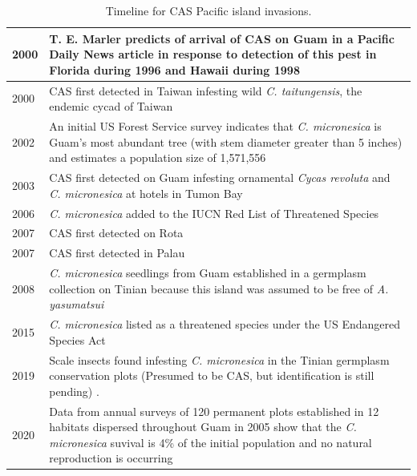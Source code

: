 \documentclass[12pt,letterpaper,english,bibliography=totocnumbered, abstract=on]{scrartcl}
\begin{document}
\begin{table}[p]
	\centering
	\label{tab:timeline}	
	\caption{Timeline for CAS Pacific island invasions.}	
	\begin{tabular}{l>{\raggedright\arraybackslash}p{4.5in}}
		\hline
		2000 & T. E. Marler predicts of arrival of CAS on Guam in a Pacific Daily News article \parencite{haynesExoticInvasivePest2005} in response to detection of this pest in Florida during 1996 \parencite{howardAulacaspisYasumatsuiHemiptera1999a} and Hawaii during 1998 \parencite{heu2003sago}
		\\\hline
		2000 & CAS first detected in Taiwan infesting wild \textit{C. taitungensis}, the endemic cycad of Taiwan
		\\\hline
		2002 & An initial US Forest Service survey indicates that \textit{C. micronesica} is Guam's most abundant tree (with stem diameter greater than 5 inches) and estimates a population size of 1,571,556 \parencite{donnegon_guams_2004}
		\\\hline
		2003 & CAS first detected on Guam infesting ornamental \textit{Cycas revoluta} and \textit{C. micronesica} at hotels in Tumon Bay
		\\\hline
		2006 & \textit{C. micronesica} added to the IUCN Red List of Threatened Species
		\\\hline
		2007 & CAS first detected on Rota
		\\\hline
		2007 & CAS first detected in Palau
		\\\hline
		2008 & \textit{C. micronesica} seedlings from Guam established in a germplasm collection on Tinian because this island was assumed to be free of \textit{A. yasumatsui}
		\\\hline
		2015 & \textit{C. micronesica} listed as a threatened species under the US Endangered Species Act \parencite{unitedstatesgovernmentEndangeredThreatenedWildlife2015}
		\\\hline
		2019 & Scale insects found infesting \textit{C. micronesica} in the Tinian germplasm conservation plots (Presumed to be CAS, but identification is still pending) \parencite{andersenairforcebaseCycadMonitoringManagement2021}.
		\\\hline
		2020 & Data from annual surveys of 120 permanent plots established in 12 habitats dispersed throughout Guam in 2005 show that the \textit{C. micronesica} suvival is 4\% of the initial population and no natural reproduction is occurring \parencite{marlerLongitudeForestFragmentation2020}
		\\\hline
	\end{tabular}	
\end{table}
\end{document}
